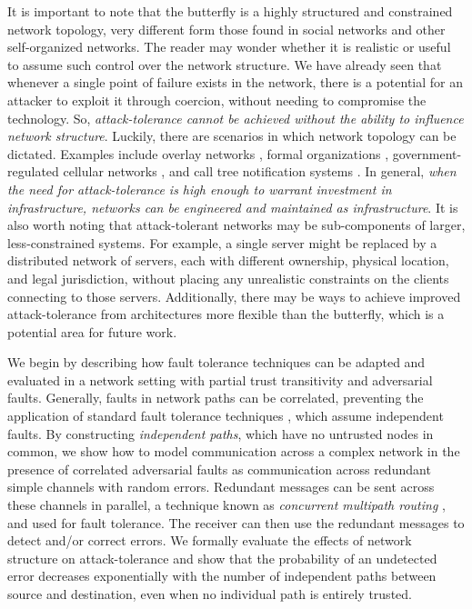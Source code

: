 \documentclass{sig-alternate-05-2015}
\begin{document}
It is important to note that the butterfly is a highly structured and constrained
network topology,
very different form those found in social networks and other
self-organized networks.
The reader may wonder whether it is realistic or useful to assume such control over
the network structure.
We have already seen that whenever a single point of failure exists in the network,
there is a potential for an attacker to exploit it through coercion,
without needing to compromise the technology.
So, {\em attack-tolerance cannot be achieved without the ability to influence
network structure}.
Luckily, there are scenarios in which network topology can be dictated.
Examples include overlay networks
\cite{lua_survey_2005, korzun_structured_2013},
formal organizations \cite{mohr_explaining_1982},
government-regulated cellular networks \cite{walker_mass_2012},
and call tree notification systems \cite{nickerson_thinking_2010}.
In general,
{\em when the need for attack-tolerance is high enough to warrant investment
in infrastructure, networks can be engineered and maintained as infrastructure}.
It is also worth noting that attack-tolerant networks may be sub-components of
larger, less-constrained systems.
For example, a single server might be replaced by a distributed network of servers,
each with different ownership, physical location, and legal jurisdiction,
without placing any unrealistic constraints on the clients connecting to
those servers.
Additionally, there may be ways to achieve improved attack-tolerance from architectures
more flexible than the butterfly, which is a potential area for future work.

We begin by describing how fault tolerance techniques can be adapted and
evaluated in a network setting with partial trust transitivity and
adversarial faults.
Generally, faults in network paths can be correlated,
preventing the application of standard fault tolerance techniques
\cite{avizienis_basic_2004, von_neumann_probabilistic_1956},
which assume independent faults.
By constructing {\em independent paths},
which have no untrusted nodes in common,
we show how to model communication across a complex network in the presence
of correlated adversarial faults as communication across redundant
simple channels with random errors.
Redundant messages can be sent across these channels in parallel,
a technique known as {\em concurrent multipath routing}
\cite{zin_survey_2015, qadir_exploiting_2015, khiani_comparative_2013},
and used for fault tolerance.
The receiver can then use the redundant messages to detect and/or correct
errors.
We formally evaluate the
effects of network structure on attack-tolerance and show that the probability
of an undetected error decreases exponentially with the number of
independent paths between source and destination,
even when no individual path is entirely trusted.
\end{document}
